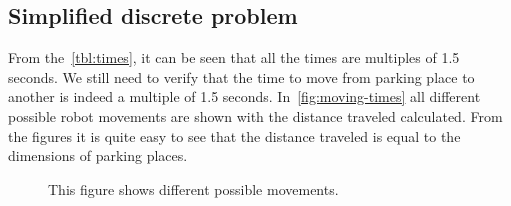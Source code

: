 \subsection{Simplified discrete problem}
From the~\autoref{tbl:times}, it can be seen that all the times are multiples
of 1.5 seconds. We still need to verify that the time to move from parking
place to another is indeed a multiple of 1.5 seconds.
In~\autoref{fig:moving-times} all different possible robot movements are shown
with the distance traveled calculated. From the figures it is quite easy to see
that the distance traveled is equal to the dimensions of parking places.

\begin{figure}[h]
    
    \caption{This figure shows different possible movements. }
    \label{fig:moving-times}
\end{figure}
